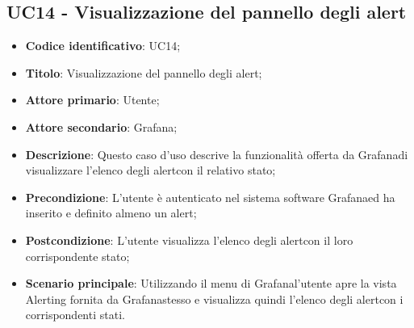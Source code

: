 \subsection{UC14 - Visualizzazione del pannello degli alert}
\begin{itemize}
	\item \textbf{Codice identificativo}: UC14;
	\item \textbf{Titolo}: Visualizzazione del pannello degli alert\glo;
	\item \textbf{Attore primario}: Utente;
	\item \textbf{Attore secondario}: Grafana\glo;
	\item \textbf{Descrizione}: Questo caso d'uso descrive la funzionalità offerta da Grafana\glosp di visualizzare l'elenco degli alert\glosp con il relativo stato;
	\item \textbf{Precondizione}: L'utente è autenticato nel sistema software Grafana\glosp ed ha inserito e definito almeno un alert\glo;
	\item \textbf{Postcondizione}: L'utente visualizza l'elenco degli alert\glosp con il loro corrispondente stato;
	\item \textbf{Scenario principale}: Utilizzando il menu di Grafana\glosp l'utente apre la vista Alerting fornita da Grafana\glosp stesso e visualizza quindi l'elenco degli alert\glosp con i corrispondenti stati.
\end{itemize} 
